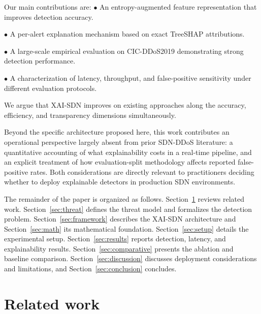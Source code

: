 \documentclass{ieeeaccess}
\begin{document}
Our main contributions are:
$\bullet$ An entropy-augmented feature representation that improves detection accuracy.

$\bullet$ A per-alert explanation mechanism based on exact TreeSHAP attributions.

$\bullet$ A large-scale empirical evaluation on CIC-DDoS2019 demonstrating strong detection performance.

$\bullet$ A characterization of latency, throughput, and false-positive sensitivity under different evaluation protocols.

We argue that XAI-SDN improves on existing approaches along the accuracy, efficiency, and transparency dimensions simultaneously.

Beyond the specific architecture proposed here, this work contributes an operational perspective largely absent from prior SDN-DDoS literature: a quantitative accounting of what explainability costs in a real-time pipeline, and an explicit treatment of how evaluation-split methodology affects reported false-positive rates. Both considerations are directly relevant to practitioners deciding whether to deploy explainable detectors in production SDN environments.

The remainder of the paper is organized as follows. Section~\ref{sec:related} reviews related work. Section~\ref{sec:threat} defines the threat model and formalizes the detection problem. Section~\ref{sec:framework} describes the XAI-SDN architecture and Section~\ref{sec:math} its mathematical foundation. Section~\ref{sec:setup} details the experimental setup. Section~\ref{sec:results} reports detection, latency, and explainability results. Section~\ref{sec:comparative} presents the ablation and baseline comparison. Section~\ref{sec:discussion} discusses deployment considerations and limitations, and Section~\ref{sec:conclusion} concludes.

\section{Related work}
\label{sec:related}
\end{document}
